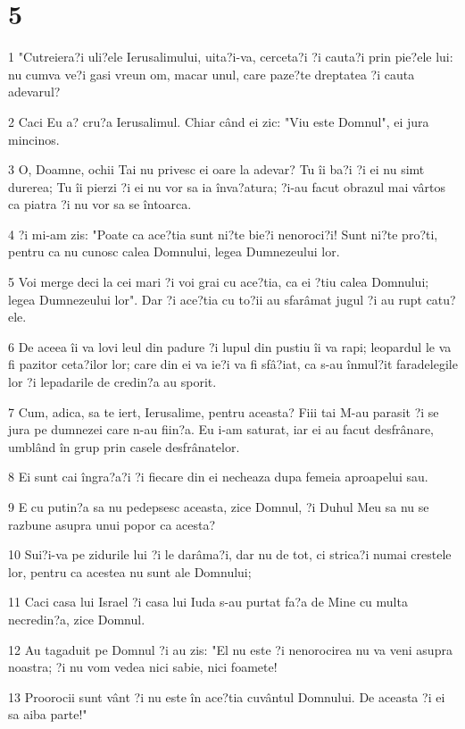 \chapter{5}

\par 1 "Cutreiera?i uli?ele Ierusalimului, uita?i-va, cerceta?i ?i cauta?i prin pie?ele lui: nu cumva ve?i gasi vreun om, macar unul, care paze?te dreptatea ?i cauta adevarul?
\par 2 Caci Eu a? cru?a Ierusalimul. Chiar când ei zic: "Viu este Domnul", ei jura mincinos.
\par 3 O, Doamne, ochii Tai nu privesc ei oare la adevar? Tu îi ba?i ?i ei nu simt durerea; Tu îi pierzi ?i ei nu vor sa ia înva?atura; ?i-au facut obrazul mai vârtos ca piatra ?i nu vor sa se întoarca.
\par 4 ?i mi-am zis: "Poate ca ace?tia sunt ni?te bie?i nenoroci?i! Sunt ni?te pro?ti, pentru ca nu cunosc calea Domnului, legea Dumnezeului lor.
\par 5 Voi merge deci la cei mari ?i voi grai cu ace?tia, ca ei ?tiu calea Domnului; legea Dumnezeului lor". Dar ?i ace?tia cu to?ii au sfarâmat jugul ?i au rupt catu?ele.
\par 6 De aceea îi va lovi leul din padure ?i lupul din pustiu îi va rapi; leopardul le va fi pazitor ceta?ilor lor; care din ei va ie?i va fi sfâ?iat, ca s-au înmul?it faradelegile lor ?i lepadarile de credin?a au sporit.
\par 7 Cum, adica, sa te iert, Ierusalime, pentru aceasta? Fiii tai M-au parasit ?i se jura pe dumnezei care n-au fiin?a. Eu i-am saturat, iar ei au facut desfrânare, umblând în grup prin casele desfrânatelor.
\par 8 Ei sunt cai îngra?a?i ?i fiecare din ei necheaza dupa femeia aproapelui sau.
\par 9 E cu putin?a sa nu pedepsesc aceasta, zice Domnul, ?i Duhul Meu sa nu se razbune asupra unui popor ca acesta?
\par 10 Sui?i-va pe zidurile lui ?i le darâma?i, dar nu de tot, ci strica?i numai crestele lor, pentru ca acestea nu sunt ale Domnului;
\par 11 Caci casa lui Israel ?i casa lui Iuda s-au purtat fa?a de Mine cu multa necredin?a, zice Domnul.
\par 12 Au tagaduit pe Domnul ?i au zis: "El nu este ?i nenorocirea nu va veni asupra noastra; ?i nu vom vedea nici sabie, nici foamete!
\par 13 Proorocii sunt vânt ?i nu este în ace?tia cuvântul Domnului. De aceasta ?i ei sa aiba parte!"
